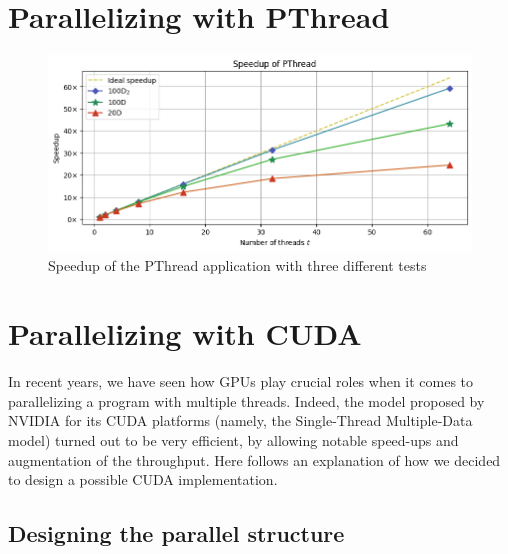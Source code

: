 \documentclass[11pt, journal]{IEEEtran}
\begin{document}

\section{Parallelizing with PThread}

\begin{figure}
    \label{pt_speedup}
    \centering
    \includegraphics[width=\linewidth]{imgs/pt_speedup.png}
    \caption{Speedup of the PThread application with three different tests}
\end{figure}


\section{Parallelizing with CUDA}

In recent years, we have seen how GPUs play crucial roles when it comes to parallelizing a program with multiple threads. Indeed, the model proposed by NVIDIA for its CUDA platforms (namely, the Single-Thread Multiple-Data model) turned out to be very efficient, by allowing notable speed-ups and augmentation of the throughput. Here follows an explanation of how we decided to design a possible CUDA implementation.

\subsection{Designing the parallel structure}
\end{document}
